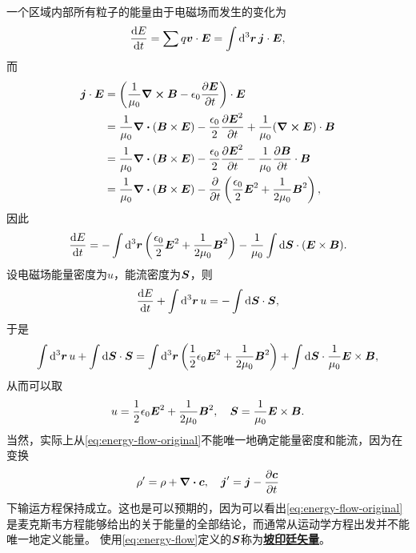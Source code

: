 \documentclass[UTF8, a4paper]{ctexart}
\newcommand*{\concept}[1]{\underline{\textbf{#1}}}
\begin{document}
一个区域内部所有粒子的能量由于电磁场而发生的变化为
\begin{equation}
    \dv{E}{t} = \sum q \vb*{v} \cdot \vb*{E} = \int \dd[3]{\vb*{r}} \vb*{j} \cdot \vb*{E},
\end{equation}
而
\[
    \begin{aligned}
        \vb*{j} \cdot \vb*{E} &= \left( \frac{1}{\mu_0} \curl{\vb*{B}} - \epsilon_0 \pdv{\vb*{E}}{t} \right) \cdot \vb*{E} \\
        &= \frac{1}{\mu_0} \div{(\vb*{B} \times \vb*{E})} - \frac{\epsilon_0}{2} \pdv{\vb*{E}^2}{t} + \frac{1}{\mu_0} (\curl{\vb*{E}}) \cdot \vb*{B} \\
        &= \frac{1}{\mu_0} \div{(\vb*{B} \times \vb*{E})} - \frac{\epsilon_0}{2} \pdv{\vb*{E}^2}{t} - \frac{1}{\mu_0} \pdv{\vb*{B}}{t} \cdot \vb*{B} \\
        &= \frac{1}{\mu_0} \div{(\vb*{B} \times \vb*{E})} - \pdv{t} \left( \frac{\epsilon_0}{2} \vb*{E}^2 + \frac{1}{2 \mu_0} \vb*{B}^2 \right),
    \end{aligned}
\]
因此
\[
    \dv{E}{t} = - \int \dd[3]{\vb*{r}} \left( \frac{\epsilon_0}{2} \vb*{E}^2 + \frac{1}{2 \mu_0} \vb*{B}^2 \right) - \frac{1}{\mu_0} \int \dd{\vb*{S}} \cdot (\vb*{E} \times \vb*{B}).
\]
设电磁场能量密度为$u$，能流密度为$\vb*{S}$，则
\[
    \dv{E}{t} + \int \dd[3]{\vb*{r}} u = - \int \dd{\vb*{S}} \cdot \vb*{S},
\]
于是
\begin{equation}
    \int \dd[3]{\vb*{r}} u + \int \dd{\vb*{S}} \cdot \vb*{S} = \int \dd[3]{\vb*{r}} \left( \frac{1}{2} \epsilon_0 \vb*{E}^2 + \frac{1}{2\mu_0} \vb*{B}^2 \right) + \int \dd{\vb*{S}} \cdot \frac{1}{\mu_0} \vb*{E} \times \vb*{B},
    \label{eq:energy-flow-original}
\end{equation}
从而可以取
\begin{equation}
    u = \frac{1}{2} \epsilon_0 \vb*{E}^2 + \frac{1}{2\mu_0} \vb*{B}^2, \quad \vb*{S} = \frac{1}{\mu_0} \vb*{E} \times \vb*{B}.
    \label{eq:energy-flow}
\end{equation}
当然，实际上从\eqref{eq:energy-flow-original}不能唯一地确定能量密度和能流，因为在变换
\[
    \rho' = \rho + \div{\vb*{c}}, \quad \vb*{j}' = \vb*{j} - \pdv{\vb*{c}}{t}
\]
下输运方程保持成立。这也是可以预期的，因为可以看出\eqref{eq:energy-flow-original}是麦克斯韦方程能够给出的关于能量的全部结论，而通常从运动学方程出发并不能唯一地定义能量。
使用\eqref{eq:energy-flow}定义的$\vb*{S}$称为\concept{坡印廷矢量}。
\end{document}
